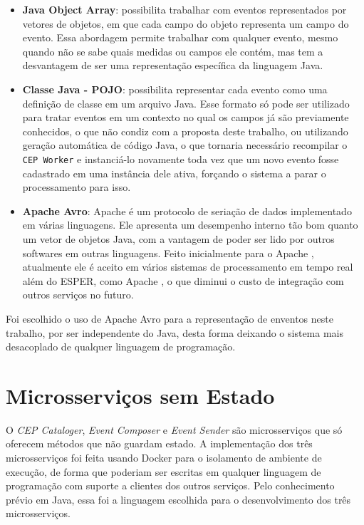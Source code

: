 \begin{itemize}
\item \textbf{Java Object Array}: possibilita trabalhar com eventos representados por vetores de objetos, em que cada campo do objeto representa um campo do evento. Essa abordagem permite trabalhar com qualquer evento, mesmo quando não se sabe quais medidas ou campos ele contém, mas tem a desvantagem de ser uma representação específica da linguagem Java.
\item \textbf{Classe Java - POJO}: possibilita representar cada evento como uma definição de classe em um arquivo Java. Esse formato só pode ser utilizado para tratar eventos em um contexto no qual os campos já são previamente conhecidos, o que não condiz com a proposta deste trabalho, ou utilizando geração automática de código Java, o que tornaria necessário recompilar o \texttt{CEP Worker} e instanciá-lo novamente toda vez que um novo evento fosse cadastrado em uma instância dele ativa, forçando o sistema a parar o processamento para isso.
\item \textbf{Apache Avro}: Apache \cite{Avro} é um protocolo de seriação de dados implementado em várias linguagens. Ele apresenta um desempenho interno tão bom quanto um vetor de objetos Java, com a vantagem de poder ser lido por outros softwares em outras linguagens. Feito inicialmente para o Apache \cite{hadoop}, atualmente ele é aceito em vários sistemas de processamento em tempo real além do ESPER, como Apache \cite{spark}, o que diminui o custo de integração com outros serviços no futuro.
\end{itemize}

Foi escolhido o uso de Apache Avro para a representação de enventos neste trabalho, por ser independente do Java, desta forma deixando o sistema mais desacoplado de qualquer linguagem de programação. 


\section{Microsserviços sem Estado}
O \textit{CEP Cataloger}, \textit{Event Composer} e \textit{Event Sender} são microsserviços que só oferecem métodos que não guardam estado. A implementação dos três microsserviços foi feita usando Docker para o isolamento de ambiente de execução, de forma que poderiam ser escritas em qualquer linguagem de programação com suporte a clientes dos outros serviços. Pelo conhecimento prévio em Java, essa foi a linguagem escolhida para o desenvolvimento dos três microsserviços.


